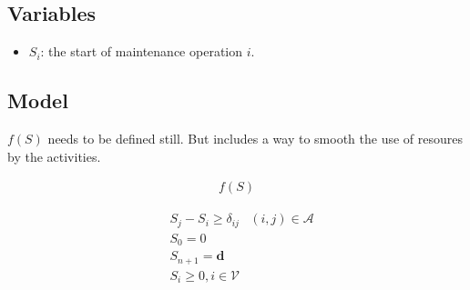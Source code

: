 \documentclass[a4paper,11pt]{article}
\begin{document}
    \subsection{Variables}

    \begin{itemize}
     \item $S_i$: the start of maintenance operation $i$.
    \end{itemize}

    \subsection{Model}

    $f(S)$ needs to be defined still. But includes a way to smooth the use of resoures by the activities.

    \begin{align}
        f(S)
    \end{align}

    \begin{align}
        & S_j - S_i \geq \delta_{ij} & (i, j) \in \mathcal{A} \\
        & S_0 = 0 & \\
        & S_{n+1} = \mathbf{d}  \\
        & S_{i} \geq 0, i \in \mathcal{V} \\
    \end{align}
\end{document}

